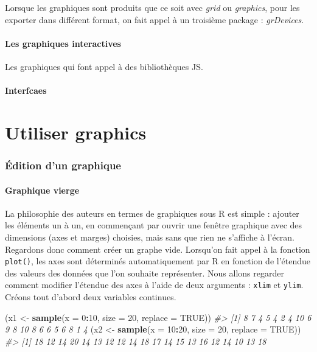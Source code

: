 \documentclass[]{article}
\newenvironment{Shaded}{\begin{snugshade}}{\end{snugshade}}
\newcommand{\CommentTok}[1]{\textcolor[rgb]{0.56,0.35,0.01}{\textit{#1}}}
\newcommand{\DataTypeTok}[1]{\textcolor[rgb]{0.13,0.29,0.53}{#1}}
\newcommand{\DecValTok}[1]{\textcolor[rgb]{0.00,0.00,0.81}{#1}}
\newcommand{\KeywordTok}[1]{\textcolor[rgb]{0.13,0.29,0.53}{\textbf{#1}}}
\newcommand{\NormalTok}[1]{#1}
\newcommand{\OperatorTok}[1]{\textcolor[rgb]{0.81,0.36,0.00}{\textbf{#1}}}
\newcommand{\OtherTok}[1]{\textcolor[rgb]{0.56,0.35,0.01}{#1}}
\newcommand{\StringTok}[1]{\textcolor[rgb]{0.31,0.60,0.02}{#1}}
\begin{document}
Lorsque les graphiques sont produits que ce soit avec \emph{grid} ou \emph{graphics}, pour les exporter dans différent format, on fait appel à un troisième package : \emph{grDevices}.

\hypertarget{les-graphiques-interactives}{%
\subsection{Les graphiques interactives}\label{les-graphiques-interactives}}

Les graphiques qui font appel à des bibliothèques JS.

\hypertarget{interfcaes}{%
\subsection{Interfcaes}\label{interfcaes}}

\hypertarget{part-utiliser-graphics}{%
\part{Utiliser graphics}\label{part-utiliser-graphics}}

\hypertarget{uxe9dition-dun-graphique}{%
\section{Édition d'un graphique}\label{uxe9dition-dun-graphique}}

\hypertarget{graphique-vierge}{%
\subsection{Graphique vierge}\label{graphique-vierge}}

La philosophie des auteurs en termes de graphiques sous R est simple : ajouter les éléments un à un, en commençant par ouvrir une fenêtre graphique avec des dimensions (axes et marges) choisies, mais sans que rien ne s'affiche à l'écran. Regardons donc comment créer un graphe vide.
Lorsqu'on fait appel à la fonction \texttt{plot()}, les axes sont déterminés automatiquement par R en fonction de l'étendue des valeurs des données que l'on souhaite représenter. Nous allons regarder comment modifier l'étendue des axes à l'aide de deux arguments : \texttt{xlim} et \texttt{ylim}.
Créons tout d'abord deux variables continues.

\begin{Shaded}
\begin{Highlighting}[]
\NormalTok{(x1 <-}\StringTok{ }\KeywordTok{sample}\NormalTok{(}\DataTypeTok{x =} \DecValTok{0}\OperatorTok{:}\DecValTok{10}\NormalTok{, }\DataTypeTok{size =} \DecValTok{20}\NormalTok{, }\DataTypeTok{replace =} \OtherTok{TRUE}\NormalTok{))}
\CommentTok{#>  [1]  8  7  4  5  4  2  4 10  6  9  8 10  8  6  6  5  6  8  1  4}
\NormalTok{(x2 <-}\StringTok{ }\KeywordTok{sample}\NormalTok{(}\DataTypeTok{x =} \DecValTok{10}\OperatorTok{:}\DecValTok{20}\NormalTok{, }\DataTypeTok{size =} \DecValTok{20}\NormalTok{, }\DataTypeTok{replace =} \OtherTok{TRUE}\NormalTok{))}
\CommentTok{#>  [1] 18 12 14 20 14 13 12 12 14 18 17 14 15 13 16 12 14 10 13 18}
\end{Highlighting}
\end{Shaded}
\end{document}
